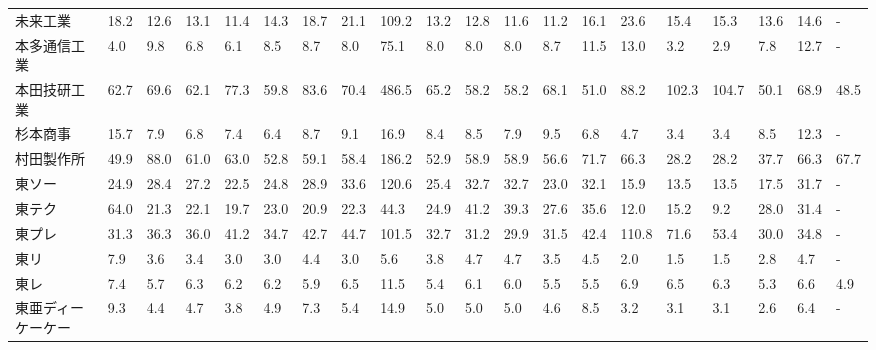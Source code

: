 \begin{longtable}[c]{lp{3mm}p{3mm}p{3mm}p{3mm}p{3mm}p{3mm}p{3mm}p{3mm}p{3mm}p{3mm}p{3mm}p{3mm}p{3mm}p{3mm}p{3mm}p{3mm}p{3mm}p{3mm}p{3mm}}
未来工業            &   18.2 &   12.6 &      13.1 &      11.4 &       14.3 &    18.7 &    21.1 &    109.2 &    13.2 &    12.8 &   11.6 &   11.2 &    16.1 &    23.6 &    15.4 &   15.3 &   13.6 &    14.6 &      - \\
本多通信工業          &    4.0 &    9.8 &       6.8 &       6.1 &        8.5 &     8.7 &     8.0 &     75.1 &     8.0 &     8.0 &    8.0 &    8.7 &    11.5 &    13.0 &     3.2 &    2.9 &    7.8 &    12.7 &      - \\
本田技研工業          &   62.7 &   69.6 &      62.1 &      77.3 &       59.8 &    83.6 &    70.4 &    486.5 &    65.2 &    58.2 &   58.2 &   68.1 &    51.0 &    88.2 &   102.3 &  104.7 &   50.1 &    68.9 &   48.5 \\
杉本商事            &   15.7 &    7.9 &       6.8 &       7.4 &        6.4 &     8.7 &     9.1 &     16.9 &     8.4 &     8.5 &    7.9 &    9.5 &     6.8 &     4.7 &     3.4 &    3.4 &    8.5 &    12.3 &      - \\
村田製作所           &   49.9 &   88.0 &      61.0 &      63.0 &       52.8 &    59.1 &    58.4 &    186.2 &    52.9 &    58.9 &   58.9 &   56.6 &    71.7 &    66.3 &    28.2 &   28.2 &   37.7 &    66.3 &   67.7 \\
東ソー             &   24.9 &   28.4 &      27.2 &      22.5 &       24.8 &    28.9 &    33.6 &    120.6 &    25.4 &    32.7 &   32.7 &   23.0 &    32.1 &    15.9 &    13.5 &   13.5 &   17.5 &    31.7 &      - \\
東テク             &   64.0 &   21.3 &      22.1 &      19.7 &       23.0 &    20.9 &    22.3 &     44.3 &    24.9 &    41.2 &   39.3 &   27.6 &    35.6 &    12.0 &    15.2 &    9.2 &   28.0 &    31.4 &      - \\
東プレ             &   31.3 &   36.3 &      36.0 &      41.2 &       34.7 &    42.7 &    44.7 &    101.5 &    32.7 &    31.2 &   29.9 &   31.5 &    42.4 &   110.8 &    71.6 &   53.4 &   30.0 &    34.8 &      - \\
東リ              &    7.9 &    3.6 &       3.4 &       3.0 &        3.0 &     4.4 &     3.0 &      5.6 &     3.8 &     4.7 &    4.7 &    3.5 &     4.5 &     2.0 &     1.5 &    1.5 &    2.8 &     4.7 &      - \\
東レ              &    7.4 &    5.7 &       6.3 &       6.2 &        6.2 &     5.9 &     6.5 &     11.5 &     5.4 &     6.1 &    6.0 &    5.5 &     5.5 &     6.9 &     6.5 &    6.3 &    5.3 &     6.6 &    4.9 \\
東亜ディーケーケー       &    9.3 &    4.4 &       4.7 &       3.8 &        4.9 &     7.3 &     5.4 &     14.9 &     5.0 &     5.0 &    5.0 &    4.6 &     8.5 &     3.2 &     3.1 &    3.1 &    2.6 &     6.4 &      - \\

\end{longtable}
